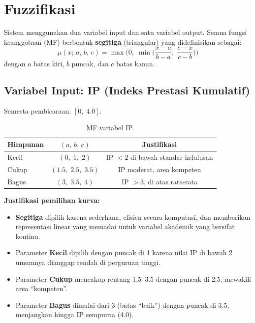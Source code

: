 \documentclass[conference]{IEEEtran}
\begin{document}
\section{Fuzzifikasi}
\label{sec:fuzzifikasi}

Sistem menggunakan dua variabel input dan satu variabel output.
Semua fungsi keanggotaan (MF) berbentuk \textbf{segitiga} (triangular)
yang didefinisikan sebagai:
\begin{equation}\label{eq:tri}
  \mu(x;\,a,\,b,\,c) = \max\!\Big(0,\;\min\!\Big(\frac{x-a}{b-a},\;\frac{c-x}{c-b}\Big)\Big)
\end{equation}
dengan $a$ batas kiri, $b$ puncak, dan $c$ batas kanan.

\subsection{Variabel Input: IP (Indeks Prestasi Kumulatif)}

Semesta pembicaraan: $[0,\;4.0]$.

\begin{table}[htbp]
\centering\caption{MF variabel IP.}
\label{tab:mf-ip}
\begin{tabular}{@{}lcc@{}}
\toprule
Himpunan & $(a,\,b,\,c)$ & Justifikasi \\
\midrule
Kecil  & $(0,\;1,\;2)$   & IP $< 2$ di bawah standar kelulusan \\
Cukup  & $(1.5,\;2.5,\;3.5)$ & IP moderat, area kompeten \\
Bagus  & $(3,\;3.5,\;4)$ & IP $> 3$, di atas rata-rata \\
\bottomrule
\end{tabular}
\end{table}

\noindent\textbf{Justifikasi pemilihan kurva:}
\begin{itemize}[nosep,leftmargin=*]
  \item \textbf{Segitiga} dipilih karena sederhana, efisien secara
        komputasi, dan memberikan representasi linear yang memadai
        untuk variabel akademik yang bersifat kontinu.
  \item Parameter \textbf{Kecil} dipilih dengan puncak di 1 karena
        nilai IP di bawah 2 umumnya dianggap rendah di perguruan
        tinggi.
  \item Parameter \textbf{Cukup} mencakup rentang 1.5--3.5 dengan
        puncak di 2.5, mewakili area ``kompeten''.
  \item Parameter \textbf{Bagus} dimulai dari 3 (batas ``baik'')
        dengan puncak di 3.5, menjangkau hingga IP sempurna (4.0).
\end{itemize}
\end{document}
